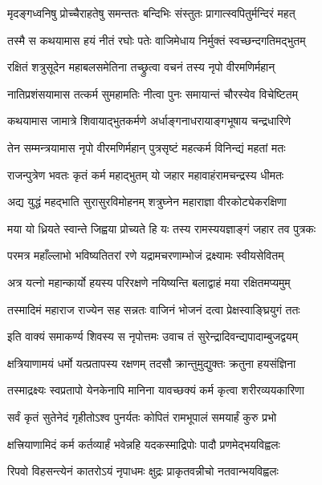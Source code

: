 \twolineshloka
{मृदङ्गध्वनिषु प्रोच्चैराहतेषु समन्ततः}
{बन्दिभिः संस्तुतः प्रागात्स्वपितुर्मन्दिरं महत्}%

\twolineshloka
{तस्मै स कथयामास हयं नीतं रघोः पतेः}
{वाजिमेधाय निर्मुक्तं स्वच्छन्दगतिमद्भुतम्}%

\twolineshloka
{रक्षितं शत्रुसूदेन महाबलसमेतिना}
{तच्छ्रुत्वा वचनं तस्य नृपो वीरमणिर्महान्}%

\twolineshloka
{नातिप्रशंसयामास तत्कर्म सुमहामतिः}
{नीत्वा पुनः समायान्तं चौरस्येव विचेष्टितम्}%

\twolineshloka
{कथयामास जामात्रे शिवायाद्भुतकर्मणे}
{अर्धाङ्गनाधरायाङ्गभूषाय चन्द्रधारिणे}%

\twolineshloka
{तेन सम्मन्त्रयामास नृपो वीरमणिर्महान्}
{पुत्रसृष्टं महत्कर्म विनिन्द्यं महतां मतः}%


\twolineshloka
{राजन्पुत्रेण भवतः कृतं कर्म महाद्भुतम्}
{यो जहार महावाहंरामचन्द्रस्य धीमतः}%

\twolineshloka
{अद्य युद्धं महद्भाति सुरासुरविमोहनम्}
{शत्रुघ्नेन महाराज्ञा वीरकोट्येकरक्षिणा}%

\twolineshloka
{मया यो ध्रियते स्वान्ते जिह्वया प्रोच्यते हि यः}
{तस्य रामस्ययज्ञाङ्गं जहार तव पुत्रकः}%

\twolineshloka
{परमत्र महाँल्लाभो भविष्यतितरां रणे}
{यद्रामचरणाम्भोजं द्रक्ष्यामः स्वीयसेवितम्}%

\twolineshloka
{अत्र यत्नो महान्कार्यो हयस्य परिरक्षणे}
{नयिष्यन्ति बलाद्वाहं मया रक्षितमप्यमुम्}%

\twolineshloka
{तस्मादिमं महाराज राज्येन सह सन्नतः}
{वाजिनं भोजनं दत्वा प्रेक्षस्वाङ्घ्रियुगं ततः}%

\twolineshloka
{इति वाक्यं समाकर्ण्य शिवस्य स नृपोत्तमः}
{उवाच तं सुरेन्द्रादिवन्द्यपादाम्बुजद्वयम्}%


\twolineshloka
{क्षत्रियाणामयं धर्मो यत्प्रतापस्य रक्षणम्}
{तदसौ क्रान्तुमुद्युक्तः क्रतुना हयसंज्ञिना}%

\twolineshloka
{तस्माद्रक्ष्यः स्वप्रतापो येनकेनापि मानिना}
{यावच्छक्यं कर्म कृत्वा शरीरव्ययकारिणा}%

\twolineshloka
{सर्वं कृतं सुतेनेदं गृहीतोऽश्व पुनर्यतः}
{कोपितं रामभूपालं समयार्हं कुरु प्रभो}%

\twolineshloka
{क्षत्त्रियाणामिदं कर्म कर्तव्यार्हं भवेन्नहि}
{यदकस्माद्रिपोः पादौ प्रणमेद्भयविह्वलः}%

\twolineshloka
{रिपवो विहसन्त्येनं कातरोऽयं नृपाधमः}
{क्षुद्रः प्राकृतवन्नीचो नतवान्भयविह्वलः}%

